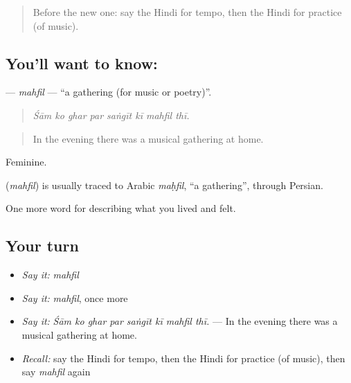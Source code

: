 \label{lesson:HI-C532-mahfil}



\begin{quote}
Before the new one: say the Hindi for tempo, then the Hindi for practice (of music).
\end{quote}

\subsection*{You'll want to know: }
\textbf{} — \emph{mahfil} — \textquotedblleft{}a gathering (for music or poetry)\textquotedblright{}.

\begin{quote}
       
\end{quote}

\begin{quote}
\emph{Śām ko ghar par saṅgīt kī mahfil thī.}
\end{quote}

\begin{quote}
In the evening there was a musical gathering at home.
\end{quote}

Feminine.

\begin{cousinweb}
\textbf{} (\emph{mahfil}) is usually traced to Arabic \emph{maḥfil}, \textquotedblleft{}a gathering\textquotedblright{}, through Persian.
\end{cousinweb}

\begin{grammarlens}[title={What you've built}]
One more word for describing what you lived and felt.
\end{grammarlens}

\subsection*{Your turn}
\begin{itemize}
\raggedright
  \item \emph{Say it:} \emph{mahfil}
  \item \emph{Say it:} \emph{mahfil}, once more
  \item \emph{Say it:} \emph{Śām ko ghar par saṅgīt kī mahfil thī.} — In the evening there was a musical gathering at home.
  \item \emph{Recall:} say the Hindi for tempo, then the Hindi for practice (of music), then say \emph{mahfil} again
\end{itemize}

